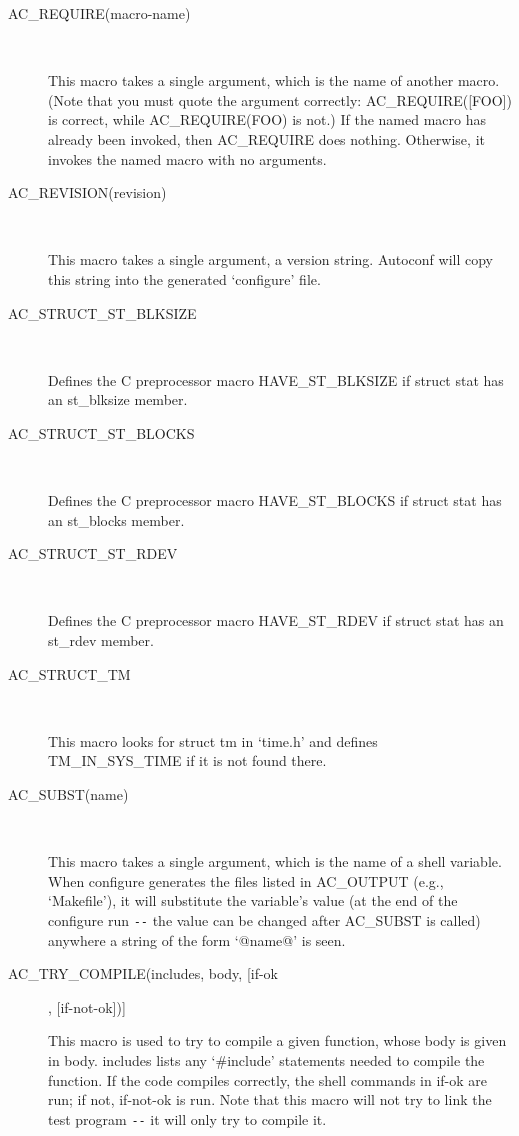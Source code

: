 \begin{description}
\item[AC\_{}REQUIRE(macro-name)]
\

    This macro takes a single argument, which is the name of another macro. (Note that you must quote the argument correctly: AC\_{}REQUIRE([FOO]) is correct, while AC\_{}REQUIRE(FOO) is not.) If the named macro has already been invoked, then AC\_{}REQUIRE does nothing. Otherwise, it invokes the named macro with no arguments.

\item[AC\_{}REVISION(revision)]
\

    This macro takes a single argument, a version string. Autoconf will copy this string into the generated `configure' file.

\item[AC\_{}STRUCT\_{}ST\_{}BLKSIZE]
\

    Defines the C preprocessor macro HAVE\_{}ST\_{}BLKSIZE if struct stat has an st\_{}blksize member.

\item[AC\_{}STRUCT\_{}ST\_{}BLOCKS]
\

    Defines the C preprocessor macro HAVE\_{}ST\_{}BLOCKS if struct stat has an st\_{}blocks member.

\item[AC\_{}STRUCT\_{}ST\_{}RDEV]
\

    Defines the C preprocessor macro HAVE\_{}ST\_{}RDEV if struct stat has an st\_{}rdev member.

\item[AC\_{}STRUCT\_{}TM]
\

    This macro looks for struct tm in `time.h' and defines TM\_{}IN\_{}SYS\_{}TIME if it is not found there.

\item[AC\_{}SUBST(name)]
\

    This macro takes a single argument, which is the name of a shell variable. When configure generates the files listed in AC\_{}OUTPUT (e.g., `Makefile'), it will substitute the variable's value (at the end of the configure run \verb+--+ the value can be changed after AC\_{}SUBST is called) anywhere a string of the form `@name@' is seen.

\item[AC\_{}TRY\_{}COMPILE(includes, body, [if-ok], [if-not-ok])]
\

    This macro is used to try to compile a given function, whose body is given in body. includes lists any `\#include' statements needed to compile the function. If the code compiles correctly, the shell commands in if-ok are run; if not, if-not-ok is run. Note that this macro will not try to link the test program \verb+--+ it will only try to compile it.


\end{description}
